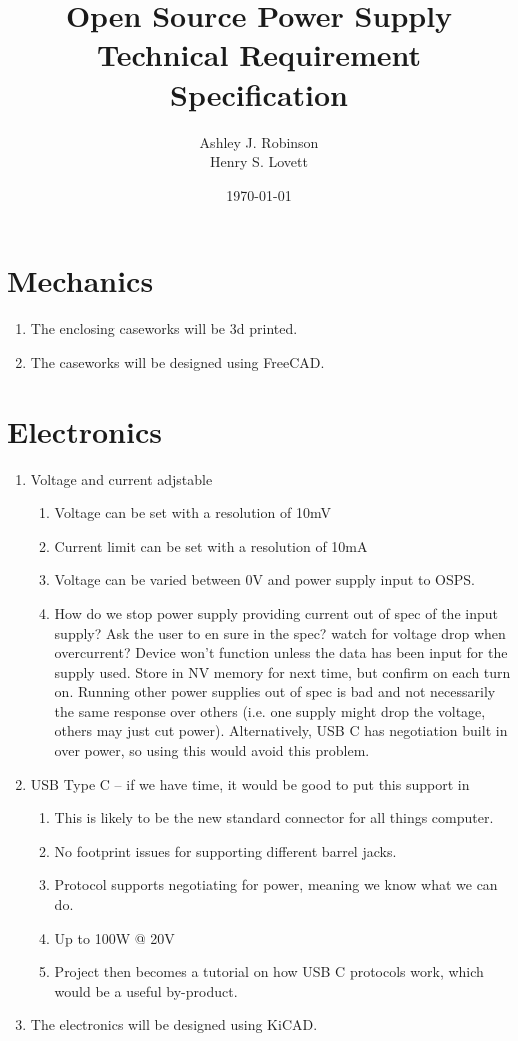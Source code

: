 \documentclass[12pt,a4paper]{article}
\title{Open Source Power Supply\\ Technical Requirement Specification}
\author{Ashley J. Robinson \\ Henry S. Lovett}
\date{\today}
\begin{document}
\maketitle



\section{Mechanics}
\begin{enumerate}[label*=\arabic*.]
\item The enclosing caseworks will be \gls{3d} printed.
\item The caseworks will be designed using FreeCAD.
\end{enumerate}



\section{Electronics}
\begin{enumerate}[label*=\arabic*.]
\item Voltage and current adjstable
	\begin{enumerate}[label*=\arabic*.]
	\item Voltage can be set with a resolution of 10mV
	\item Current limit can be set with a resolution of 10mA
	\item Voltage can be varied between 0V and power supply input to OSPS.
	\item How do we stop power supply providing current out of spec of the input supply? Ask the user to en sure in the spec? watch for voltage drop when overcurrent? Device won't 	function unless the data has been input for the supply used. Store in NV memory for next time, but confirm on each turn on. Running other power supplies out of spec is bad and not necessarily the same response over others (i.e. one supply might drop the voltage, others may just cut power). Alternatively, USB C has negotiation built in over power, so using this would avoid this problem. 
	\end{enumerate}
\item  USB Type C – if we have time, it would be good to put this support in
	\begin{enumerate}[label*=\arabic*.]
	\item This is likely to be the new standard connector for all things computer.
	\item No footprint issues for supporting different barrel jacks.
	\item Protocol supports negotiating for power, meaning we know what we can do. 
	\item Up to 100W @ 20V
	\item Project then becomes a tutorial on how USB C protocols work, which would be a useful by-product. 
	\end{enumerate}
\item The electronics will be designed using KiCAD.
\end{enumerate}
\end{document}
